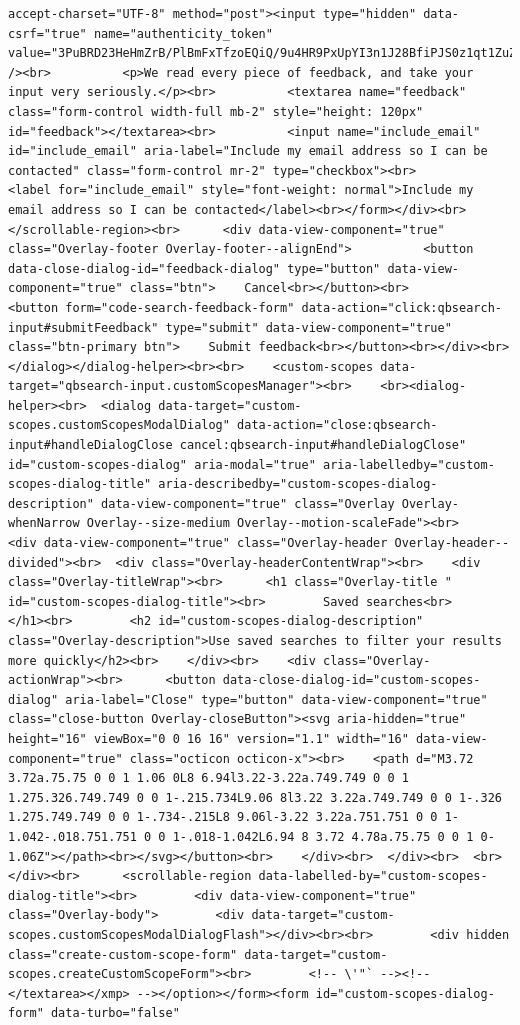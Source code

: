 \documentclass[
  letterpaper,
]{book}
\begin{document}
\begin{verbatim}
accept-charset="UTF-8" method="post"><input type="hidden" data-csrf="true" name="authenticity_token" value="3PuBRD23HeHmZrB/PlBmFxTfzoEQiQ/9u4HR9PxUpYI3n1J28BfiPJS0z1qt1ZuZ7qDACJqmgTuW6eptN6KACQ==" /><br>          <p>We read every piece of feedback, and take your input very seriously.</p><br>          <textarea name="feedback" class="form-control width-full mb-2" style="height: 120px" id="feedback"></textarea><br>          <input name="include_email" id="include_email" aria-label="Include my email address so I can be contacted" class="form-control mr-2" type="checkbox"><br>          <label for="include_email" style="font-weight: normal">Include my email address so I can be contacted</label><br></form></div><br>      </scrollable-region><br>      <div data-view-component="true" class="Overlay-footer Overlay-footer--alignEnd">          <button data-close-dialog-id="feedback-dialog" type="button" data-view-component="true" class="btn">    Cancel<br></button><br>          <button form="code-search-feedback-form" data-action="click:qbsearch-input#submitFeedback" type="submit" data-view-component="true" class="btn-primary btn">    Submit feedback<br></button><br></div><br></dialog></dialog-helper><br><br>    <custom-scopes data-target="qbsearch-input.customScopesManager"><br>    <br><dialog-helper><br>  <dialog data-target="custom-scopes.customScopesModalDialog" data-action="close:qbsearch-input#handleDialogClose cancel:qbsearch-input#handleDialogClose" id="custom-scopes-dialog" aria-modal="true" aria-labelledby="custom-scopes-dialog-title" aria-describedby="custom-scopes-dialog-description" data-view-component="true" class="Overlay Overlay-whenNarrow Overlay--size-medium Overlay--motion-scaleFade"><br>    <div data-view-component="true" class="Overlay-header Overlay-header--divided"><br>  <div class="Overlay-headerContentWrap"><br>    <div class="Overlay-titleWrap"><br>      <h1 class="Overlay-title " id="custom-scopes-dialog-title"><br>        Saved searches<br>      </h1><br>        <h2 id="custom-scopes-dialog-description" class="Overlay-description">Use saved searches to filter your results more quickly</h2><br>    </div><br>    <div class="Overlay-actionWrap"><br>      <button data-close-dialog-id="custom-scopes-dialog" aria-label="Close" type="button" data-view-component="true" class="close-button Overlay-closeButton"><svg aria-hidden="true" height="16" viewBox="0 0 16 16" version="1.1" width="16" data-view-component="true" class="octicon octicon-x"><br>    <path d="M3.72 3.72a.75.75 0 0 1 1.06 0L8 6.94l3.22-3.22a.749.749 0 0 1 1.275.326.749.749 0 0 1-.215.734L9.06 8l3.22 3.22a.749.749 0 0 1-.326 1.275.749.749 0 0 1-.734-.215L8 9.06l-3.22 3.22a.751.751 0 0 1-1.042-.018.751.751 0 0 1-.018-1.042L6.94 8 3.72 4.78a.75.75 0 0 1 0-1.06Z"></path><br></svg></button><br>    </div><br>  </div><br>  <br></div><br>      <scrollable-region data-labelled-by="custom-scopes-dialog-title"><br>        <div data-view-component="true" class="Overlay-body">        <div data-target="custom-scopes.customScopesModalDialogFlash"></div><br><br>        <div hidden class="create-custom-scope-form" data-target="custom-scopes.createCustomScopeForm"><br>        <!-- \'"` --><!-- </textarea></xmp> --></option></form><form id="custom-scopes-dialog-form" data-turbo="false" 
\end{verbatim}
\end{document}
